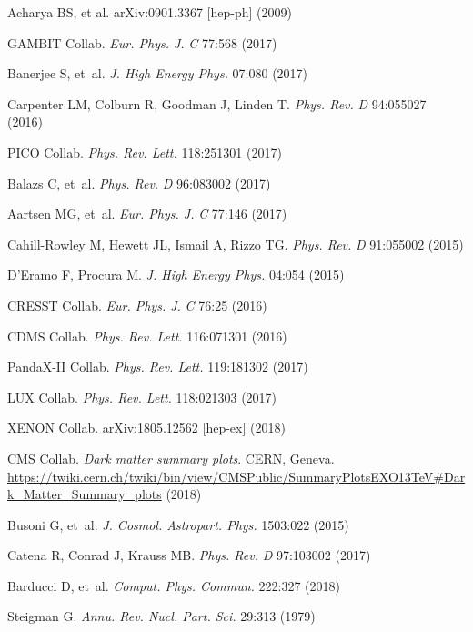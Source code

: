 \documentclass{ar-1col}
\begin{document}
\begin{thebibliography}{175}
  Acharya BS, et al. arXiv:0901.3367 [hep-ph] (2009)

GAMBIT Collab. \textit{Eur. Phys. J.} \textit{C} 77:568 (2017)

Banerjee S, et~al. \textit{J. High Energy Phys.} 07:080 (2017)

Carpenter LM, Colburn R, Goodman J, Linden T. \textit{Phys. Rev.}
\textit{D} 94:055027 (2016)

PICO Collab. \textit{Phys. Rev. Lett.} 118:251301 (2017)

Balazs C, et~al. \textit{Phys. Rev.} \textit{D} 96:083002 (2017)

Aartsen MG, et~al. \textit{Eur. Phys. J.} \textit{C} 77:146 (2017)

Cahill-Rowley M, Hewett JL, Ismail A, Rizzo TG. \textit{Phys.
Rev.} \textit{D} 91:055002 (2015)

D'Eramo F, Procura M. \textit{J. High Energy Phys.} 04:054 (2015)

CRESST Collab. \textit{Eur. Phys. J.} \textit{C} 76:25 (2016)

CDMS Collab. \textit{Phys. Rev. Lett.} 116:071301 (2016)

PandaX-II Collab. \textit{Phys. Rev. Lett.} 119:181302 (2017)

LUX Collab. \textit{Phys. Rev. Lett.} 118:021303 (2017)

XENON Collab. arXiv:1805.12562 [hep-ex] (2018)

CMS Collab. \textit{Dark \MakeLowercase{Matter Summary Plots}}. CERN, Geneva. \url{https://twiki.cern.ch/twiki/bin/view/CMSPublic/SummaryPlotsEXO13TeV#Dark_Matter_Summary_plots} (2018)

Busoni G, et~al. \textit{J. Cosmol. Astropart. Phys.} 1503:022 (2015)

Catena R, Conrad J, Krauss MB. \textit{Phys. Rev.} \textit{D} 97:103002 (2017)

Barducci D, et~al. \textit{Comput. Phys. Commun.} 222:327 (2018)

Steigman G. \textit{Annu. Rev. Nucl. Part. Sci.} 29:313 (1979)
  

\end{thebibliography}
\end{document}
